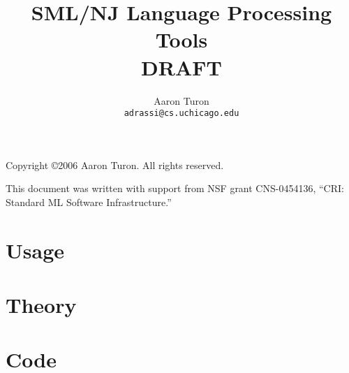 \documentclass[11pt]{book}
\title{SML/NJ Language Processing Tools\\
DRAFT}
\author{Aaron Turon\\
\texttt{adrassi@cs.uchicago.edu}}
\newcommand{\parttext}{}
\newcommand{\cpart}[1]{\renewcommand{\parttext}{#1}\part{#1}}
\begin{document}
\frontmatter

	\maketitle
	
	\phantom{.}
	
	\noindent Copyright \copyright{}2006 Aaron Turon.  All rights reserved.
	
	\vskip 12pt
	\noindent This document was written with support from NSF grant CNS-0454136, ``CRI: Standard ML Software Infrastructure.''
	
	\pagebreak
	
	\tableofcontents

\mainmatter

	\cpart{Usage}
	
		
		
	
	\cpart{Theory}
	
		
		

	\cpart{Code}

		
		

\backmatter

	
	
\end{document}
